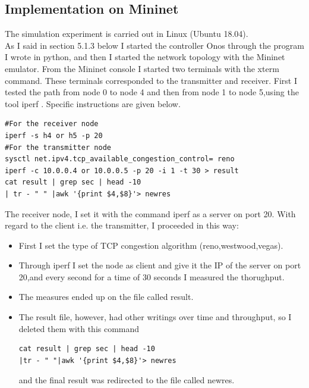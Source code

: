 {{\subsection{Implementation on Mininet}{
The simulation experiment is carried out in Linux (Ubuntu 18.04).\\As I said in section 5.1.3 below I started the controller Onos through the program I wrote in python, and then I started the network topology with the Mininet emulator. From the Mininet console I started two terminals with the xterm command. These terminals corresponded to the transmitter and receiver. First I tested the path from node 0 to node 4 and then from node 1 to node 5,using the tool iperf \cite{gg}.  
Specific instructions are given below.
\begin{lstlisting}[frame=single,basicstyle=\tiny]
#For the receiver node
iperf -s h4 or h5 -p 20
#For the transmitter node
sysctl net.ipv4.tcp_available_congestion_control= reno
iperf -c 10.0.0.4 or 10.0.0.5 -p 20 -i 1 -t 30 > result
cat result | grep sec | head -10 
| tr - " " |awk '{print $4,$8}'> newres
\end{lstlisting}

The receiver node, I set it with the command iperf as a server on port 20.
With regard to the client i.e. the transmitter, I proceeded in this way:
\begin{itemize}
	\item First I set the type of TCP congestion algorithm (reno,westwood,vegas).
	\item Through iperf I set the node as client and give it the IP of the server on port 20,and every second for a time of 30 seconds I measured the thorughput. 
	\item The measures ended up on the file called result. 
	\item The result file, however, had other writings over time and throughput, so I deleted them with this command \begin{lstlisting}[frame=single,basicstyle=\small]
cat result | grep sec | head -10 
|tr - " "|awk '{print $4,$8}'> newres 
	\end{lstlisting} 
	and the final result was redirected to the file called newres.
\end{itemize}
}
}}
